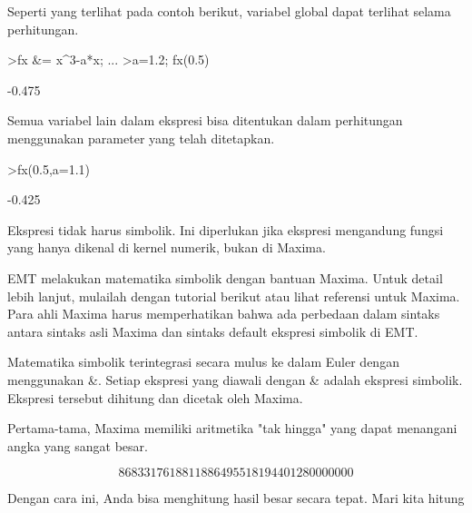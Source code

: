 \documentclass[a4paper,10pt]{article}
\begin{document}
\begin{eulernotebook}
\begin{eulercomment}
\begin{eulercomment}
\begin{eulercomment}
\begin{eulercomment}
\begin{eulercomment}
\begin{eulercomment}
\begin{eulercomment}
Seperti yang terlihat pada contoh berikut, variabel global dapat
terlihat selama perhitungan.
\end{eulercomment}
\begin{eulerprompt}
>fx &= x^3-a*x;  ...
>a=1.2; fx(0.5)
\end{eulerprompt}
\begin{euleroutput}
  -0.475
\end{euleroutput}
\begin{eulercomment}
Semua variabel lain dalam ekspresi bisa ditentukan dalam perhitungan
menggunakan parameter yang telah ditetapkan.
\end{eulercomment}
\begin{eulerprompt}
>fx(0.5,a=1.1)
\end{eulerprompt}
\begin{euleroutput}
  -0.425
\end{euleroutput}
\begin{eulercomment}
Ekspresi tidak harus simbolik. Ini diperlukan jika ekspresi mengandung
fungsi yang hanya dikenal di kernel numerik, bukan di Maxima.

\begin{eulercomment}
\begin{eulercomment}
EMT melakukan matematika simbolik dengan bantuan Maxima. Untuk detail
lebih lanjut, mulailah dengan tutorial berikut atau lihat referensi
untuk Maxima. Para ahli Maxima harus memperhatikan bahwa ada perbedaan
dalam sintaks antara sintaks asli Maxima dan sintaks default ekspresi
simbolik di EMT.

Matematika simbolik terintegrasi secara mulus ke dalam Euler dengan
menggunakan \&. Setiap ekspresi yang diawali dengan \& adalah ekspresi
simbolik. Ekspresi tersebut dihitung dan dicetak oleh Maxima.

Pertama-tama, Maxima memiliki aritmetika "tak hingga" yang dapat
menangani angka yang sangat besar.
\end{eulercomment}
\begin{eulerformula}
\[
8683317618811886495518194401280000000
\]
\end{eulerformula}
\begin{eulercomment}
Dengan cara ini, Anda bisa menghitung hasil besar secara tepat. Mari
kita hitung


\end{eulercomment}
\end{eulercomment}
\end{eulercomment}
\end{eulercomment}
\end{eulercomment}
\end{eulercomment}
\end{eulercomment}
\end{eulercomment}
\end{eulercomment}
\end{eulernotebook}
\end{document}
